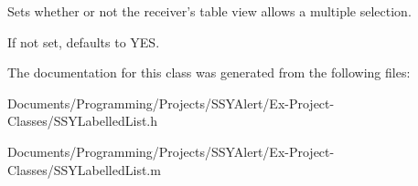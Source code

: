 Sets whether or not the receiver's table view allows a multiple selection. 

If not set, defaults to YES. 

The documentation for this class was generated from the following files:\begin{CompactItemize}
\item 
Documents/Programming/Projects/SSYAlert/Ex-Project-Classes/SSYLabelledList.h\item 
Documents/Programming/Projects/SSYAlert/Ex-Project-Classes/SSYLabelledList.m\end{CompactItemize}

